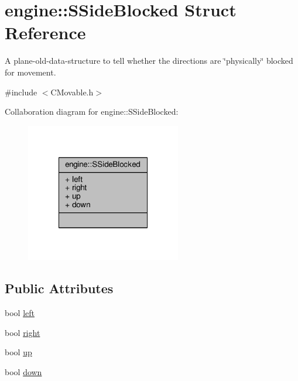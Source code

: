 \hypertarget{structengine_1_1SSideBlocked}{\section{engine\-:\-:S\-Side\-Blocked Struct Reference}
\label{structengine_1_1SSideBlocked}
}


A plane-\/old-\/data-\/structure to tell whether the directions are \char`\"{}physically\char`\"{} blocked for movement.  




{\ttfamily \#include $<$C\-Movable.\-h$>$}



Collaboration diagram for engine\-:\-:S\-Side\-Blocked\-:\nopagebreak
\begin{figure}[H]
\begin{center}
\leavevmode
\includegraphics[width=192pt]{structengine_1_1SSideBlocked__coll__graph}
\end{center}
\end{figure}
\subsection*{Public Attributes}
\begin{DoxyCompactItemize}
\item 
bool \hyperlink{structengine_1_1SSideBlocked_aab2ebe596bade5dd2111290ff4171268}{left}
\item 
bool \hyperlink{structengine_1_1SSideBlocked_af6f555a50cd295e753bc57ba1fe98b7b}{right}
\item 
bool \hyperlink{structengine_1_1SSideBlocked_a62f8b294229bf0f52bc01ffcc9086202}{up}
\item 
bool \hyperlink{structengine_1_1SSideBlocked_ab0a5ec3de4a3a1f71eb8c28dcaa113ec}{down}
\end{DoxyCompactItemize}


